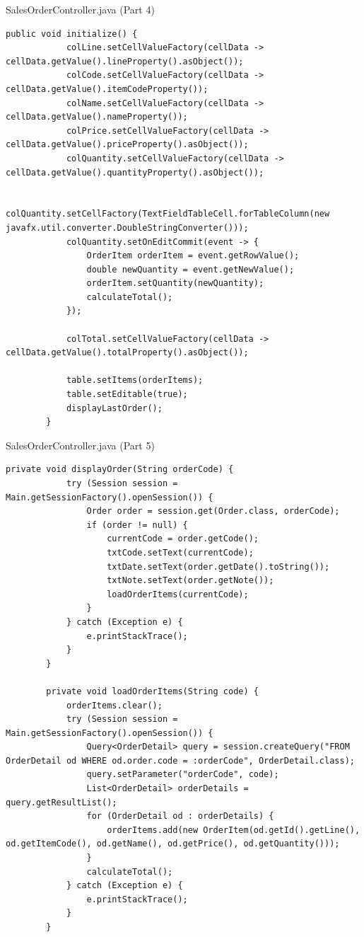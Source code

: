 \documentclass[aspectratio=169, table]{beamer}
\begin{document}
\begin{frame}[fragile]{SalesOrderController.java (Part 4)}
	\vspace{20pt}
	\begin{lstlisting}[style=JavaStyle]
		public void initialize() {
			colLine.setCellValueFactory(cellData -> cellData.getValue().lineProperty().asObject());
			colCode.setCellValueFactory(cellData -> cellData.getValue().itemCodeProperty());
			colName.setCellValueFactory(cellData -> cellData.getValue().nameProperty());
			colPrice.setCellValueFactory(cellData -> cellData.getValue().priceProperty().asObject());
			colQuantity.setCellValueFactory(cellData -> cellData.getValue().quantityProperty().asObject());
			
			colQuantity.setCellFactory(TextFieldTableCell.forTableColumn(new javafx.util.converter.DoubleStringConverter()));
			colQuantity.setOnEditCommit(event -> {
				OrderItem orderItem = event.getRowValue();
				double newQuantity = event.getNewValue();
				orderItem.setQuantity(newQuantity);
				calculateTotal();
			});
			
			colTotal.setCellValueFactory(cellData -> cellData.getValue().totalProperty().asObject());
			
			table.setItems(orderItems);
			table.setEditable(true);
			displayLastOrder();
		}
	\end{lstlisting}
\end{frame}

\begin{frame}[fragile]{SalesOrderController.java (Part 5)}
	\vspace{20pt}
	\begin{lstlisting}[style=JavaStyle]
		private void displayOrder(String orderCode) {
			try (Session session = Main.getSessionFactory().openSession()) {
				Order order = session.get(Order.class, orderCode);
				if (order != null) {
					currentCode = order.getCode();
					txtCode.setText(currentCode);
					txtDate.setText(order.getDate().toString());
					txtNote.setText(order.getNote());
					loadOrderItems(currentCode);
				}
			} catch (Exception e) {
				e.printStackTrace();
			}
		}
		
		private void loadOrderItems(String code) {
			orderItems.clear();
			try (Session session = Main.getSessionFactory().openSession()) {
				Query<OrderDetail> query = session.createQuery("FROM OrderDetail od WHERE od.order.code = :orderCode", OrderDetail.class);
				query.setParameter("orderCode", code);
				List<OrderDetail> orderDetails = query.getResultList();
				for (OrderDetail od : orderDetails) {
					orderItems.add(new OrderItem(od.getId().getLine(), od.getItemCode(), od.getName(), od.getPrice(), od.getQuantity()));
				}
				calculateTotal();
			} catch (Exception e) {
				e.printStackTrace();
			}
		}
	\end{lstlisting}
\end{frame}
\end{document}
